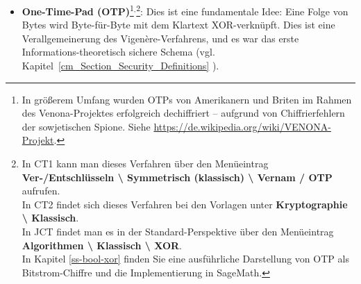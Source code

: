 \begin{refsegment}
\begin{itemize}
\begin{itemize}
   \item \textbf{Porta} \cite{ACA2002}:
      Vigen\`ere-Variante, die nur 13 Alphabete verwendet. Das bedeutet, dass
      jeweils zwei Schlüsselbuch"-staben dasselbe Geheimtextalphabet zugeordnet
      wird, und die erste und zweite Hälfte des Alphabets reziprok sind.

   \item \textbf{Slidefair} \cite{ACA2002}:
      Kann als Vigen\`ere-, Gronsfeld- oder Beaufort-Variante verwendet werden.
      Dieses Verfahren verschlüsselt Digramme. Den ersten Buchstaben sucht man
      im Klartextalphabet über dem Tableau, den zweiten in der Zeile, die dem
      Schlüsselbuch"-staben entspricht. Diese beiden Punkte bilden
      gegenüberliegende Punkte eines gedachten Rechtecks, die verbleibenden
      Ecken bilden die Geheimtextzeichen.

\end{itemize}



       \item \textbf{One-Time-Pad (OTP)}\footnote{%
             In größerem Umfang wurden OTPs von Amerikanern und Briten im Rahmen des
	     \glqq Venona\grqq-Projektes erfolgreich dechiffriert -- aufgrund von Chiffrierfehlern
	     der sowjetischen Spione. Siehe \url{https://de.wikipedia.org/wiki/VENONA-Projekt}.
          }$^,$\footnote{%
            In CT1 kann man dieses Verfahren über den
            Menüeintrag \textbf{Ver-/Entschlüsseln \textbackslash{} Symmetrisch
            (klassisch) \textbackslash{} Vernam / OTP} aufrufen.\\
            In CT2 findet sich dieses Verfahren bei den Vorlagen
            unter \textbf{Kryptographie \textbackslash{} Klassisch}.\\
            In JCT findet man es in der Standard-Perspektive
            über den Menüeintrag \textbf{Algorithmen \textbackslash{} Klassisch
            \textbackslash{} XOR}.\\
	    In Kapitel \ref{ss-bool-xor} finden Sie eine ausführliche Darstellung
	    von OTP als Bitstrom-Chiffre und die Implementierung in SageMath.
          }:
          Dies ist eine fundamentale Idee:
	  Eine Folge von Bytes wird Byte-für-Byte mit dem Klartext XOR-verknüpft.
          Dies ist eine Verallgemeinerung des Vigen\`ere-Verfahrens, und es war
          das erste Informations-theoretisch sichere Schema (vgl.
          Kapitel~\ref{cm_Section_Security_Definitions}
          \glqq {}\grqq).
	

\end{itemize}
\end{refsegment}
